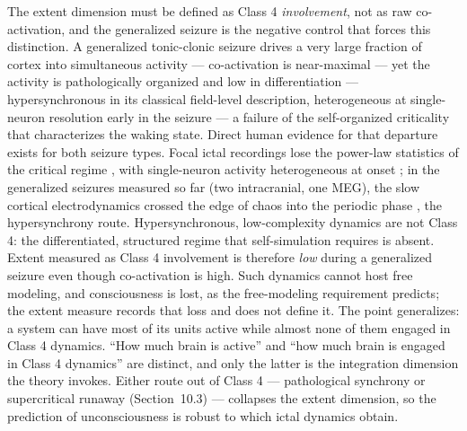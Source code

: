 \documentclass[12pt]{article}
\newcommand{\revend}{}
\begin{document}
{The extent dimension must be defined as Class 4 \emph{involvement}, not as raw co-activation, and the generalized seizure is the negative control that forces this distinction. A generalized tonic-clonic seizure drives a very large fraction of cortex into simultaneous activity --- co-activation is near-maximal --- yet the activity is pathologically organized and low in differentiation --- hypersynchronous in its classical field-level description, heterogeneous at single-neuron resolution early in the seizure --- a failure of the self-organized criticality that characterizes the waking state. Direct human evidence for that departure exists for both seizure types. Focal ictal recordings lose the power-law statistics of the critical regime \citep{Meisel2012}, with single-neuron activity heterogeneous at onset \citep{Truccolo2011}; in the generalized seizures measured so far (two intracranial, one MEG), the slow cortical electrodynamics crossed the edge of chaos into the periodic phase \citep{Toker2022}, the hypersynchrony route. Hypersynchronous, low-complexity dynamics are not Class 4: the differentiated, structured regime that self-simulation requires is absent. Extent measured as Class 4 involvement is therefore \emph{low} during a generalized seizure even though co-activation is high. Such dynamics cannot host free modeling, and consciousness is lost, as the free-modeling requirement predicts; the extent measure records that loss and does not define it. The point generalizes: a system can have most of its units active while almost none of them engaged in Class 4 dynamics. ``How much brain is active'' and ``how much brain is engaged in Class 4 dynamics'' are distinct, and only the latter is the integration dimension the theory invokes. Either route out of Class 4 --- pathological synchrony or supercritical runaway (Section~10.3) --- collapses the extent dimension, so the prediction of unconsciousness is robust to which ictal dynamics obtain.\revend}
\end{document}
